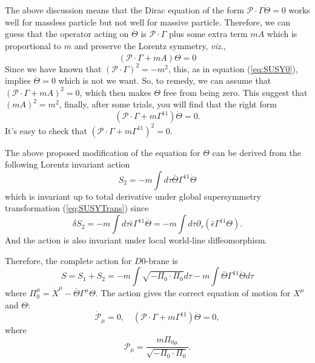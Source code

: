 \documentclass[graybox,envcountchap,sectrefs]{svmono}
\begin{document}
The above discussion means that the Dirac equation of the form $\mathcal{P}\cdot \Gamma \dot{\Theta} =0$ works well for massless particle but not well for massive particle. Therefore, we can guess that the operator acting on $\dot{\Theta}$ is $\mathcal{P}\cdot \Gamma $ plus some extra term $mA$ which is proportional to $m$ and preserve the Lorentz symmetry, \emph{viz.},
\begin{equation}
(\mathcal{P}\cdot \Gamma	+mA)\dot{\Theta}=0
\end{equation}
 Since we have known that 
$(\mathcal{P}\cdot \Gamma )^2=-m^2$, this, as in equation (\ref{eq:SUSY0}), implies $\dot{\Theta}=0$ which is not we want. So, to remedy, we can assume that $(\mathcal{P}\cdot \Gamma+mA)^2=0$, which then makes $\dot{\Theta}$ free from being zero. This suggest that $(mA)^2=m^2$, finally, after some trials, you will find that the right form 
\begin{equation}
(\mathcal{P}\cdot \Gamma+m\Gamma^{11})\dot{\Theta}=0.	
\end{equation}
It's easy to check that $(\mathcal{P}\cdot \Gamma+m\Gamma^{11})^2=0$.

The above proposed modification of the equation for $\Theta$ can be derived from the following Lorentz invariant action
\begin{equation}
	S_{2}=-m \int d \tau \bar{\Theta} \Gamma^{11} \dot{\Theta}
\end{equation}
which is invariant up to total derivative under global supersymmetry transformation (\ref{eq:SUSYTrans}) since
\begin{equation}
\delta S_{2}=-m \int d \tau \bar{\epsilon} \Gamma^{11} \dot{\Theta}=-m \int d \tau \partial_{\tau}\left(\bar{\epsilon} \Gamma^{11} \Theta\right).
\end{equation}
And the action is also invariant under local world-line diffeomorphism. 
\begin{svgraybox}
	Therefore, the complete action for $D0$-brane is
\begin{equation}\boxed{
S=S_1+S_2=-m\int \sqrt{-\Pi_0\cdot \Pi_0}d\tau -m\int 	\bar{\Theta} \Gamma^{11} \dot{\Theta} d\tau
}
\end{equation}
where $\Pi_0^{\mu}=\dot{X}^{\mu}-\bar{\Theta}\Gamma^{\mu}\dot{\Theta}$.
The action gives the correct equation of motion for $X^{\mu}$ and $\Theta$:
\begin{equation}
\dot{\mathcal{P}}_{\mu}=0,\quad 	(\mathcal{P}\cdot \Gamma+m\Gamma^{11})\dot{\Theta}=0,
\end{equation}
where 
\begin{equation}
\mathcal{P}_{\mu}=\frac{m \Pi_{0 \mu}}{\sqrt{-\Pi_{0} \cdot \Pi_{0}}}	.
\end{equation}
\end{svgraybox}
\end{document}
